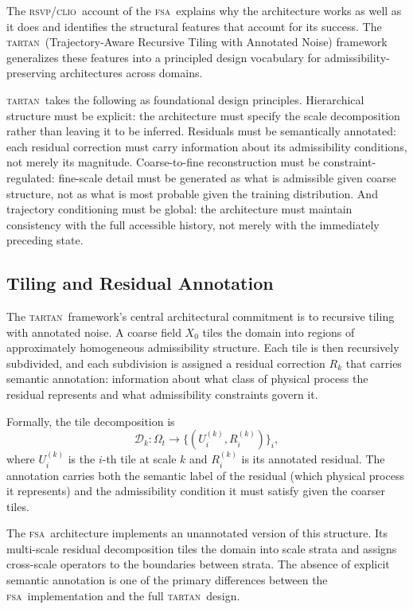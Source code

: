 \documentclass[11pt,a4paper]{article}
\theoremstyle{plain}
\theoremstyle{definition}
\theoremstyle{remark}
\newcommand{\RSVP}{\textup{\textsc{rsvp}}}
\newcommand{\CLIO}{\textup{\textsc{clio}}}
\newcommand{\TARTAN}{\textup{\textsc{tartan}}}
\newcommand{\FSA}{\textup{\textsc{fsa}}}
\newcommand{\Omg}{\Omega}
\begin{document}
The \RSVP/\CLIO\ account of the \FSA\ explains why the architecture works
as well as it does and identifies the structural features that account for
its success. The \TARTAN\ (Trajectory-Aware Recursive Tiling with
Annotated Noise) framework generalizes these features into a principled
design vocabulary for admissibility-preserving architectures across domains.

\TARTAN\ takes the following as foundational design principles. Hierarchical
structure must be explicit: the architecture must specify the scale
decomposition rather than leaving it to be inferred. Residuals must be
semantically annotated: each residual correction must carry information
about its admissibility conditions, not merely its magnitude. Coarse-to-fine
reconstruction must be constraint-regulated: fine-scale detail must be
generated as what is admissible given coarse structure, not as what is
most probable given the training distribution. And trajectory conditioning
must be global: the architecture must maintain consistency with the full
accessible history, not merely with the immediately preceding state.

\subsection{Tiling and Residual Annotation}

The \TARTAN\ framework's central architectural commitment is to recursive
tiling with annotated noise. A coarse field $X_0$ tiles the domain into
regions of approximately homogeneous admissibility structure. Each tile is
then recursively subdivided, and each subdivision is assigned a residual
correction $R_k$ that carries semantic annotation: information about what
class of physical process the residual represents and what admissibility
constraints govern it.

Formally, the tile decomposition is
\[
\mathcal{D}_k: \Omg_t \to \bigl\{(U_i^{(k)}, R_i^{(k)})\bigr\}_{i},
\]
where $U_i^{(k)}$ is the $i$-th tile at scale $k$ and $R_i^{(k)}$ is its
annotated residual. The annotation carries both the semantic label of the
residual (which physical process it represents) and the admissibility
condition it must satisfy given the coarser tiles.

The \FSA\ architecture implements an unannotated version of this structure.
Its multi-scale residual decomposition tiles the domain into scale strata
and assigns cross-scale operators to the boundaries between strata. The
absence of explicit semantic annotation is one of the primary differences
between the \FSA\ implementation and the full \TARTAN\ design.
\end{document}
